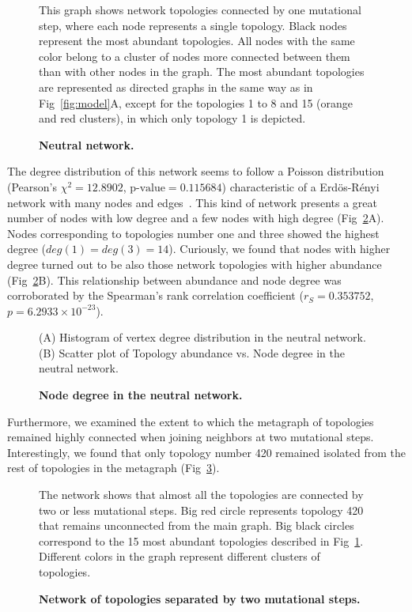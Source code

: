 \documentclass[10pt,letterpaper]{article}
\begin{document}
\begin{figure}[!h]
 \caption{\bf Neutral network.}
 This graph shows network topologies connected by one mutational step, where
 each node represents a single topology. Black nodes represent the most
 abundant topologies. All nodes with the same
 color belong to a cluster of nodes more connected between them than with other
 nodes in the graph. The most abundant topologies are represented as
 directed graphs in the same way as in Fig~\ref{fig:model}A, except for
 the topologies 1 to 8 and 15 (orange and red clusters), in which only
 topology 1 is depicted.
 \label{fig:neutral-network}
\end{figure}

The degree distribution of this network seems to follow a Poisson distribution
(Pearson’s $\chi^2 = 12.8902$, $\text{p-value} = 0.115684$) characteristic of a
Erdös-Rényi network with many nodes and edges~\cite{Erdos1959}. This kind of
network presents a great
number of nodes with low degree and a few nodes with high degree
(Fig~\ref{fig:deg-dist}A). Nodes corresponding to topologies number one and
three showed the highest degree ($deg(1) = deg (3) = 14$). Curiously, we found
that nodes with higher degree turned out to be also those network topologies
with higher abundance
(Fig~\ref{fig:deg-dist}B). This relationship between abundance and node degree
was corroborated by the Spearman's rank correlation coefficient
($r_S = 0.353752$, $p = 6.2933\times10^{-23} $).

\begin{figure}[!h]
 \caption{\bf Node degree in the neutral network.}
 (A) Histogram of vertex degree distribution in the neutral network.
 (B) Scatter plot of Topology abundance vs. Node degree in the neutral
 network.
 \label{fig:deg-dist}
\end{figure}

Furthermore, we examined the extent to which the metagraph of topologies
remained highly connected when joining neighbors at two mutational steps.
Interestingly, we found that only topology number 420 remained isolated from
the rest of topologies in the metagraph (Fig~\ref{fig:2neut-net}).

\begin{figure}
 \caption{\bf Network of topologies separated by two mutational steps.}
 The network shows that almost all the topologies are connected by two or less
 mutational steps. Big red circle represents topology 420 that remains
 unconnected from the main graph. Big black circles correspond to the 15
 most abundant topologies described in Fig~\ref{fig:neutral-network}.
 Different colors in the graph represent different clusters of topologies.
 \label{fig:2neut-net}
\end{figure}
\end{document}
